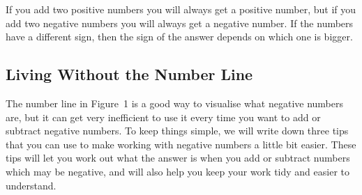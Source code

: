     \par
        \label{m38346*id174774}If you add two positive numbers you will always get a positive number, but if
you add two negative numbers you will always get a negative number. If the
numbers have a different sign, then the sign of the answer depends on which one is
bigger.\par 
      \label{m38346*uid26}
            \subsection{ Living Without the Number Line}
            \nopagebreak
        \label{m38346*id174789}The number line in Figure~1 is a good way to visualise
what negative numbers are, but it can get very inefficient to use it every time
you want to add or subtract negative numbers. To keep things simple, we will
write down three tips that you can use to make working with negative numbers a
little bit easier. These tips will let you work out what the answer is when you
add or subtract numbers which may be negative, and will also help you keep your
work tidy and easier to understand.\par 
        \label{m38346*uid27}
